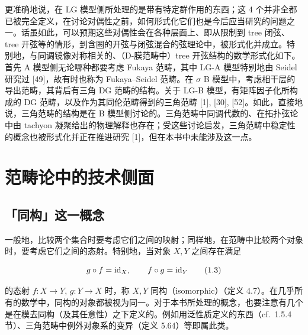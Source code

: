 更准确地说，在 LG 模型侧所处理的是带有特定群作用的东西；这 4 个并非全都已被完全定义，在讨论对偶性之前，如何形式化它们也是今后应当研究的问题之一。话虽如此，可以预期这些对偶性会在各种层面上、即从限制到 tree 闭弦、tree 开弦等的情形，到含圈的开弦与闭弦混合的弦理论中，被形式化并成立。特别地，与同调镜像对称相关的、（D-膜范畴中）tree 开弦结构的数学形式化如下。首先 A 模型侧无论哪种都要考虑 Fukaya 范畴，其中 LG-A 模型特别地由 Seidel 研究过 [49]，故有时也称为 Fukaya–Seidel 范畴。在 $\sigma$ B 模型中，考虑相干层的导出范畴，其背后有三角 DG 范畴的结构。关于 LG-B 模型，有矩阵因子化所构成的 DG 范畴，以及作为其同伦范畴得到的三角范畴 [1], [30], [52]。如此，直接地说，三角范畴的结构是在 B 模型侧讨论的。三角范畴中同调代数的、在拓扑弦论中由 tachyon 凝聚给出的物理解释也存在；受这些讨论启发，三角范畴中稳定性的概念也被形式化并正在推进研究 [1]，但在本书中未能涉及这一点。


\section{范畴论中的技术侧面}

\subsection{「同构」这一概念}

一般地，比较两个集合时要考虑它们之间的映射；同样地，在范畴中比较两个对象时，要考虑它们之间的态射。特别地，当对象 $X,Y$ 之间存在满足

\begin{equation}
g\circ f=\mathrm{id}_X,\qquad f\circ g=\mathrm{id}_Y \tag{1.3}
\end{equation}

的态射 $f : X\to Y$, $g : Y\to X$ 时，称 $X,Y$ 同构（isomorphic）（定义 4.7）。在几乎所有的数学中，同构的对象都被视为同一。对于本书所处理的概念，也要注意有几个是在模去同构（及其任意性）之下定义的。例如用泛性质定义的东西（cf.\ 1.5.4 节）、三角范畴中例外对象系的变异（定义 5.64）等即属此类。


